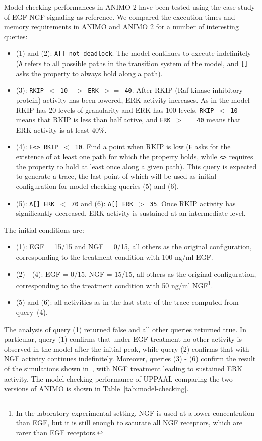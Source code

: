 \documentclass{bmcart}
\def\animo2{ANIMO 2}
\begin{document}
Model checking performances in \animo2{} have been tested using the case study of EGF-NGF signaling as reference.
We compared the execution times and memory requirements in ANIMO and \animo2{} for a number of interesting queries:
\begin{itemize}
  \item (1) and (2): {\tt A[] not deadlock}. The model continues to execute indefinitely ({\tt A} refers to all
      possible paths in the transition system of the model, and {\tt []} asks the property to always hold along a path).
  \item (3): {\tt RKIP $<$ 10 --$>$ ERK $>=$ 40}. After RKIP (Raf kinase inhibitory protein) activity has been lowered, ERK activity increases. As in the model RKIP
      has 20 levels of granularity and ERK has 100 levels, {\tt RKIP $<$ 10} means that RKIP is less than half active, and
      {\tt ERK $>=$ 40} means that ERK activity is at least $40 \%$.
  \item (4): {\tt E<> RKIP $<$ 10}. Find a point when RKIP is low ({\tt E} asks for the existence of at least one path
      for which the property holds, while {\tt <>} requires the property to hold at least once along a given path).
      This query is expected to generate a trace, the last point of which will be used as initial configuration for model checking queries (5) and (6).
  \item (5): {\tt A[] ERK $<$ 70} and (6): {\tt A[] ERK $>$ 35}. Once RKIP activity has significantly decreased, ERK activity is sustained at an intermediate level.
\end{itemize}
The initial conditions are:
\begin{itemize}
  \item (1): EGF = 15/15 and NGF = 0/15, all others as the original configuration, corresponding to the treatment condition with
	    100 ng/ml EGF.
  \item (2) - (4): EGF = 0/15, NGF = 15/15, all others as the original configuration, corresponding to the treatment condition with
	    50 ng/ml NGF\footnote{In the laboratory experimental setting, NGF is used at a lower concentration than EGF, but it is still enough to saturate all NGF receptors, which
	    are rarer than EGF receptors.}.
  \item (5) and (6): all activities as in the last state of the trace computed from query~(4).
\end{itemize}



The analysis of query (1) returned false and all other queries returned true.
In particular, query (1) confirms that under EGF treatment no other activity is observed in the model after the initial peak,
while query (2) confirms that with NGF activity continues indefinitely.
Moreover, queries (3) - (6) confirm the result of the simulations shown in~\cite{animo-bibe}, with NGF treatment leading to sustained ERK activity.
The model checking performance of UPPAAL comparing the two versions of ANIMO is shown in Table~\ref{tab:model-checking}.
\end{document}
